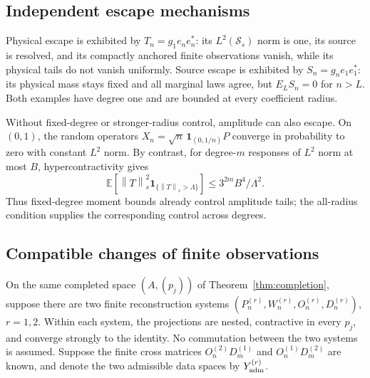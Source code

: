 \documentclass[11pt,a4paper]{amsart}
\numberwithin{equation}{section}
\theoremstyle{definition}
\theoremstyle{remark}
\newcommand{\E}{\mathbb E}
\newcommand{\Sch}{\mathcal S}
\newcommand{\norm}[1]{\left\lVert#1\right\rVert}
\begin{document}
\subsection{Independent escape mechanisms}
Physical escape is exhibited by $T_n=g_1e_ne_n^*$: its $L^2(\Sch_s)$ norm is one, its source is resolved, and its compactly anchored finite observations vanish, while its physical tails do not vanish uniformly. Source escape is exhibited by $S_n=g_ne_1e_1^*$: its physical mass stays fixed and all marginal laws agree, but $E_LS_n=0$ for $n>L$. Both examples have degree one and are bounded at every coefficient radius.

Without fixed-degree or stronger-radius control, amplitude can also escape. On $(0,1)$, the random operators $X_n=\sqrt n\,\mathbf1_{(0,1/n)}P$ converge in probability to zero with constant $L^2$ norm. By contrast, for degree-$m$ responses of $L^2$ norm at most $B$, hypercontractivity gives
\[
 \E[\norm T_s^2\mathbf1_{\{\norm T_s>\Lambda\}}]
 \le3^{2m}B^4/\Lambda^2.
\]
Thus fixed-degree moment bounds already control amplitude tails; the all-radius condition supplies the corresponding control across degrees.

\subsection{Compatible changes of finite observations}
On the same completed space $(A,(p_j))$ of Theorem~\ref{thm:completion}, suppose there are two finite reconstruction systems
$(P_n^{(r)},W_n^{(r)},O_n^{(r)},D_n^{(r)})$, $r=1,2$.
Within each system, the projections are nested, contractive in every $p_j$, and converge strongly to the identity. No commutation between the two systems is assumed. Suppose the finite cross matrices $O_n^{(2)}D_m^{(1)}$ and $O_n^{(1)}D_m^{(2)}$ are known, and denote the two admissible data spaces by $Y_{\rm adm}^{(r)}$.
\end{document}
